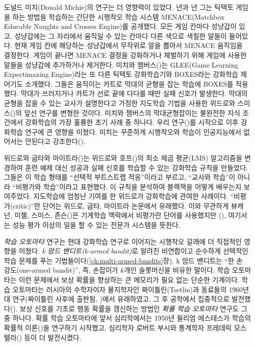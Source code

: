 도널드 미치(Donald Michie)의 연구는 더 영향력이 있었다. \cite*{Michie1961}년과
\cite*{Michie1963}년 그는 틱택토 게임을 하는 방법을 학습하는 간단한 시행착오
학습 시스템 MENACE(Matchbox Educable Naughts and Crosses Engine)를 공개했다.
모든 게임 칸마다 성냥갑이 있고, 성냥갑에는 그 자리에서 움직일 수 있는 칸마다
다른 색으로 색칠한 알들이 들어있다. 현재 게임 칸에 해당하는 성냥갑에서 무작위로
알을 뽑아서 MENACE 움직임을 결정한다. 게임이 끝나면 MENACE 결정을 강화하거나
체벌하기 위해 게임에 사용한 알들을 성냥갑에 추가하거나 제거한다. 미치와
챔버스(\cite{MichieChambers1968})는 GLEE(Game Learning Expectimaxing Engine)라는
또 다른 틱택토 강화학습기와 BOXES라는 강화학습 제어기도 소개했다. 그들은
움직이는 카트로 막대의 균형을 잡는 학습에 BOXES를 적용했다. 막대가 쓰러지거나
카트가 선로 끝에 다다를 때만 실패 신호가 발생한다. 막대의 균형을 잡을 수 있는
교사가 설명한다고 가정한 지도학습 기법을 사용한 위드로와
스미스(\cite{WidrowSmith1964})의 앞선 연구를 변형한 것이다. 미치와 챔버스의
막대균형잡이는 불완전한 지식 조건에서 강화학습의 가장 훌륭한 초기 사례 중
하나다. 우리 연구(\cite{BartoSuttonAnderson1983, Sutton1984})를 시작으로 이후
강화학습 연구에 큰 영향을 미쳤다. 미치는 꾸준하게 시행착오와 학습이 인공지능에서
없어서는 안된다고 강조한다(\cite{Michie1974}).

위드로와 굽타와 마이트라(\cite{WidrowGuptaMaitra1973})는 위드로와
호프(\cite{WidrowHoff1960})의 최소 제곱 평균(LMS) 알고리즘을 변경하여 훈련 예제
대신 성공과 실패 신호를 학습할 수 있는 강화학습 규칙을 만들었다. 그들은 이 학습
형태를 ``선택적 부트스트랩 적응''이라고 부르고, ``교사와 학습''이 아니라
``비평가와 학습''이라고 표현했다. 이 규칙을 분석하여 블랙잭을 어떻게 배우는지
보여주었다. 지도학습에 엄청난 기여를 한 위드로가 강화학습에 관여한 사례이다.
``비평가(critic)''란 단어는 위드로, 굽타, 마이트라 논문에서 유래했다. 이와
무관하게 뷰캐넌, 미첼, 스미스, 존슨(\cite{BuchananMitchellSmithJohnson1978})은
기계학습 맥락에서 비평가란 단어를 사용했지만
(\cite[또,][참고]{DietterichBuchanan1984}), 여기서는 성능 평가 이상의 일을 할 수
있는 전문가 시스템을 뜻한다.


\emph{학습 오토마타} 연구는 현대 강화학습 연구로 이어지는 시행착오 갈래에 더
직접적인 영향을 미쳤다. \emph{k 암드 밴디트(k-armed bandit)}로 알려진 비연합이고
순수하게 선택적인 학습 문제를 푸는 기법들이다(\ref{ch:multi-armed-bandits}장).
k 암드 밴디트는 ``한 손 강도(one-armed bandit)'', 즉, 손잡이가 $k$개인
슬롯머신을 비유한 말이다. 학습 오토마타는 이런 문제에서 보상 확률을 향상하는 큰
메모리가 필요 없는 단순한 기계이다. 학습 오토마타는 러시아의 수학자이자
물지학자인 짜이틀린(Tsetlin)과 동료들의 1960년대 연구(짜이틀린 사후에 출판됨,
\cite*{Tsetlin1973})에서 유래하였고, 그 후 공학에서 집중적으로
발전했다(\cite[참고]{NarendraThathachar1974, NarendraThathachar1989}). 보상
신호를 기초로 행동 확률을 갱신하는 방법인 \emph{확률 학습 오토마타} 연구도 그중
하나다. 확률 학습 오토마타에 앞서 심리학에서는 1950년 윌리엄 에스테스가 학습의
확률적 이론(\cite{Estes1950})을 연구하기 시작했고, 심리학자 로버트 부시와
통계학자 프레데릭 모스텔라(\cite{BushMosteller1955}) 등이 더 발전시켰다.

